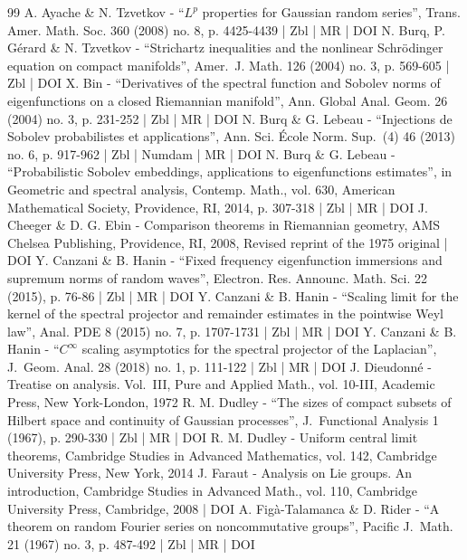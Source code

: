 \begin{thebibliography}{99}
A. Ayache \& N. Tzvetkov - “$L^p$ properties for Gaussian random series”, Trans. Amer. Math. Soc. 360 (2008) no. 8, p. 4425-4439 | Zbl | MR | DOI
N. Burq, P. Gérard \& N. Tzvetkov - “Strichartz inequalities and the nonlinear Schrödinger equation on compact manifolds”, Amer. J. Math. 126 (2004) no. 3, p. 569-605 | Zbl | DOI
X. Bin - “Derivatives of the spectral function and Sobolev norms of eigenfunctions on a closed Riemannian manifold”, Ann. Global Anal. Geom. 26 (2004) no. 3, p. 231-252 | Zbl | MR | DOI
N. Burq \& G. Lebeau - “Injections de Sobolev probabilistes et applications”, Ann. Sci. École Norm. Sup. (4) 46 (2013) no. 6, p. 917-962 | Zbl | Numdam | MR | DOI
N. Burq \& G. Lebeau - “Probabilistic Sobolev embeddings, applications to eigenfunctions estimates”, in Geometric and spectral analysis, Contemp. Math., vol. 630, American Mathematical Society, Providence, RI, 2014, p. 307-318 | Zbl | MR | DOI
J. Cheeger \& D. G. Ebin - Comparison theorems in Riemannian geometry, AMS Chelsea Publishing, Providence, RI, 2008, Revised reprint of the 1975 original | DOI
Y. Canzani \& B. Hanin - “Fixed frequency eigenfunction immersions and supremum norms of random waves”, Electron. Res. Announc. Math. Sci. 22 (2015), p. 76-86 | Zbl | MR | DOI
Y. Canzani \& B. Hanin - “Scaling limit for the kernel of the spectral projector and remainder estimates in the pointwise Weyl law”, Anal. PDE 8 (2015) no. 7, p. 1707-1731 | Zbl | MR | DOI
Y. Canzani \& B. Hanin - “$C^\infty $ scaling asymptotics for the spectral projector of the Laplacian”, J. Geom. Anal. 28 (2018) no. 1, p. 111-122 | Zbl | MR | DOI
J. Dieudonné - Treatise on analysis. Vol. III, Pure and Applied Math., vol. 10-III, Academic Press, New York-London, 1972
R. M. Dudley - “The sizes of compact subsets of Hilbert space and continuity of Gaussian processes”, J. Functional Analysis 1 (1967), p. 290-330 | Zbl | MR | DOI
R. M. Dudley - Uniform central limit theorems, Cambridge Studies in Advanced Mathematics, vol. 142, Cambridge University Press, New York, 2014
J. Faraut - Analysis on Lie groups. An introduction, Cambridge Studies in Advanced Math., vol. 110, Cambridge University Press, Cambridge, 2008 | DOI
A. Figà-Talamanca \& D. Rider - “A theorem on random Fourier series on noncommutative groups”, Pacific J. Math. 21 (1967) no. 3, p. 487-492 | Zbl | MR | DOI

\end{thebibliography}

